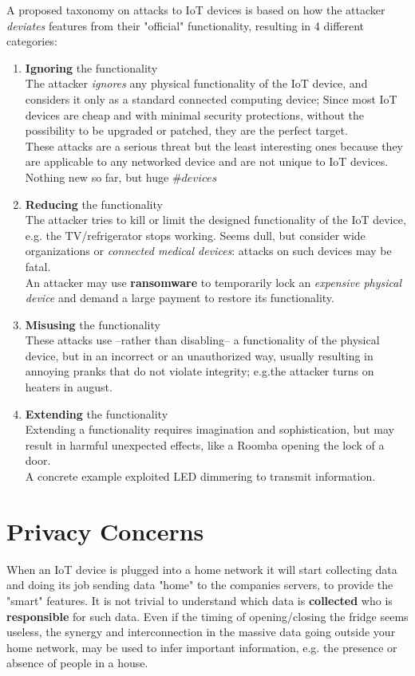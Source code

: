 A proposed taxonomy on attacks to IoT devices is based on how the attacker \textit{deviates} features from their "official" functionality,
resulting in 4 different categories:
\begin{enumerate}
   \item \textbf{Ignoring} the functionality\\
   The attacker \textit{ignores} any physical functionality of the IoT device, and considers it only as a standard connected computing device;
   Since most IoT devices are cheap and with minimal security protections,
   without the possibility to be upgraded or patched, they are the perfect target.\\
   These attacks are a serious threat but the least interesting ones because they
   are applicable to any networked device and are not unique to IoT devices.
   Nothing new so far, but huge $\#devices$
   \item \textbf{Reducing} the functionality\\
   The attacker tries to kill or limit the designed functionality of the IoT device, e.g. the TV/refrigerator stops working.
   Seems dull, but consider wide organizations or \textit{connected medical devices}:
   attacks on such devices may be fatal.\\
   An attacker may use \textbf{ransomware} to temporarily lock an
   \textit{expensive physical device} and demand a large payment to restore its
   functionality.
   \item \textbf{Misusing} the functionality\\
   These attacks use {--}rather than disabling{--} a functionality of the
   physical device, but in an incorrect or an unauthorized way,
   usually resulting in annoying pranks that do not violate integrity;
   e.g.the attacker turns on heaters in august.
   \item \textbf{Extending} the functionality\\
   Extending a functionality requires imagination and sophistication,
   but may result in harmful unexpected effects, like a Roomba opening the lock of a door.\\
   A concrete example exploited LED dimmering to transmit information.
\end{enumerate}

\section{Privacy Concerns}
When an IoT device is plugged into a home network it
will start collecting data and doing its job sending data "home" to the companies servers,
to provide the "smart" features.
It is not trivial to understand which data is \textbf{collected} who is \textbf{responsible} for such data.
Even if the timing of opening/closing the fridge seems useless,
the synergy and interconnection in the massive data going outside your home network,
may be used to infer important information,
e.g. the presence or absence of people in a house.

